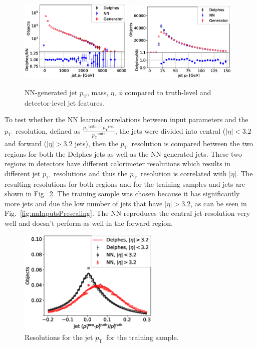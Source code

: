 \documentclass[showpacs,showkeys,preprint,prd,nofootinbib,linenumbers,12pt]{revtex4-1}
\def\pt{\ensuremath{p_{\mathrm{T}}}}
\def\ptRes{\ensuremath{\pt^{\mathrm{truth}}-\pt^{\mathrm{reco}}}}
\begin{document}
\begin{figure}[htb]
  \includegraphics[width=0.48\textwidth]{figures/nn/jet_pT_genVsReco_origScale_test_batchSize10_log.eps}
  \includegraphics[width=0.48\textwidth]{figures/nn/jet_pT_genVsReco_origScale_zoom_test_batchSize10.eps}
  \caption{NN-generated jet \pt, mass, $\eta$, $\phi$ compared to truth-level and detector-level jet features. }
  \label{fig:nnVsDelphes}
\end{figure}

To test whether the NN learned correlations between input parameters and the \pt\ resolution, defined as $\frac{\ptRes}{\pt^{\text{truth}}}$, the jets were divided into central ($|\eta|<3.2$ and forward ($|\eta|>3.2$ jets), then the \pt\ resolution is compared between the two regions for both the Delphes jets as well as the NN-generated jets. These two regions in detectors have different calorimeter resolutions which results in different jet \pt\ resolutions and thus the \pt\ resolution is correlated with $|\eta|$. The resulting resolutions for both regions and for the training samples and jets are shown in Fig.~\ref{fig:nnRes}. The training sample was chosen because it has significantly more jets and due the low number of jets that have $|\eta|>3.2$, as can be seen in Fig.~\ref{fig:nnInputsPrescaling}. The NN reproduces the central jet resolution very well and doesn't perform as well in the forward region.

\begin{figure}[htb]
  \includegraphics[width=0.6\textwidth]{figures/nn/jet_pTResEta_batchSize10.eps}
  \caption{Resolutions for the jet \pt\ for the training sample. }
  \label{fig:nnRes}
\end{figure}
\end{document}
